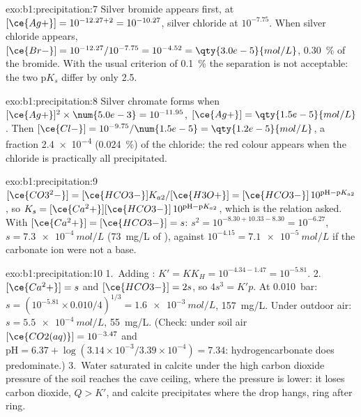 \begin{solution}{exo:b1:precipitation:7}
Silver bromide appears first, at $[\ce{Ag+}] = 10^{-12.27 + 2} =
10^{-10.27}$, silver chloride at $10^{-7.75}$. When silver chloride
appears, $[\ce{Br-}] = 10^{-12.27}/10^{-7.75} = 10^{-4.52} =
\qty{3.0e-5}{mol/L}$, \qty{0.30}{\percent} of the bromide. With the usual
criterion of \qty{0.1}{\percent} the separation is not acceptable: the two
$\mathrm{p}K_s$ differ by only 2.5.
\end{solution}

\begin{solution}{exo:b1:precipitation:8}
Silver chromate forms when $[\ce{Ag+}]^2 \times \num{5.0e-3} = 10^{-11.95}$,
$[\ce{Ag+}] = \qty{1.5e-5}{mol/L}$. Then $[\ce{Cl-}] = 10^{-9.75}/\num{1.5e-5}
= \qty{1.2e-5}{mol/L}$, a fraction \num{2.4e-4} (\qty{0.024}{\percent}) of the
chloride: the red colour appears when the chloride is practically all
precipitated.
\end{solution}

\begin{solution}{exo:b1:precipitation:9}
$[\ce{CO3^2-}] = [\ce{HCO3-}]K_{a2}/[\ce{H3O+}] = [\ce{HCO3-}]\,10^{\mathrm{pH}
- \mathrm{p}K_{a2}}$, so $K_s = [\ce{Ca^2+}][\ce{HCO3-}]\,10^{\mathrm{pH} -
\mathrm{p}K_{a2}}$, which is the relation asked. With $[\ce{Ca^2+}] =
[\ce{HCO3-}] = s$: $s^2 = 10^{-8.30 + 10.33 - 8.30} = 10^{-6.27}$,
$s = \qty{7.3e-4}{mol/L}$ (\qty{73}{mg/L} of ), against
$10^{-4.15} = \qty{7.1e-5}{mol/L}$ if the carbonate ion were not a base.
\end{solution}

\begin{solution}{exo:b1:precipitation:10}
1.~Adding : $K' = K K_H = 10^{-4.34 - 1.47} =
10^{-5.81}$.
2.~$[\ce{Ca^2+}] = s$ and $[\ce{HCO3-}] = 2s$, so $4s^3 = K'p$. At
\qty{0.010}{bar}: $s = (10^{-5.81} \times 0.010/4)^{1/3} =
\qty{1.6e-3}{mol/L}$, \qty{157}{mg/L}. Under outdoor air:
$s = \qty{5.5e-4}{mol/L}$, \qty{55}{mg/L}. (Check: under soil air
$[\ce{CO2(aq)}] = 10^{-3.47}$ and $\mathrm{pH} = 6.37 + \log(3.14\times
10^{-3}/3.39 \times 10^{-4}) = 7.34$: hydrogencarbonate does predominate.)
3.~Water saturated in calcite under the high carbon dioxide pressure of
the soil reaches the cave ceiling, where the pressure is lower: it loses
carbon dioxide, $Q > K'$, and calcite precipitates where the drop hangs,
ring after ring.
\end{solution}

